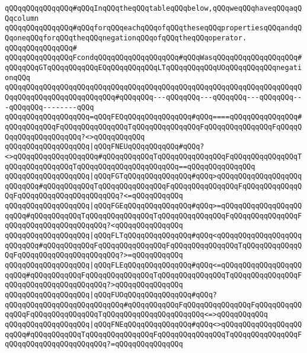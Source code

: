 \verb|qQQqqQQqqQQqqQQq#qQQqInqQQqtheqQQqtableqQQqbelow,qQQqweqQQqhaveqQQqaqQQqcolumn|\newline
\verb|qQQqqQQqqQQqqQQq#qQQqforqQQqeachqQQqofqQQqtheseqQQqpropertiesqQQqandqQQqoneqQQqforqQQqtheqQQqnegationqQQqofqQQqtheqQQqoperator.|\newline
\verb|qQQqqQQqqQQqqQQq#|\newline
\verb|qQQqqQQqqQQqqQQqFcondqQQqqQQqqQQqqQQqqQQq#qQQqWasqQQqqQQqqQQqqQQqqQQq#qQQqqQQqGTqQQqqQQqqQQqEQqQQqqQQqqQQqLTqQQqqQQqqQQqUOqQQqqQQqqQQqnegationqQQq|\newline
\verb|qQQqqQQqqQQqqQQqqQQqqQQqqQQqqQQqqQQqqQQqqQQqqQQqqQQqqQQqqQQqqQQqqQQqqQQqqQQqqQQqqQQqqQQqqQQqqQQq#qQQqqQQq---qQQqqQQq---qQQqqQQq---qQQqqQQq---qQQqqQQq--------qQQq|\newline
\verb|qQQqqQQqqQQqqQQqqQQq=qQQqFEQqQQqqQQqqQQqqQQq#qQQq====qQQqqQQqqQQqqQQq#qQQqqQQqqQQqFqQQqqQQqqQQqqQQqTqQQqqQQqqQQqqQQqFqQQqqQQqqQQqqQQqFqQQqqQQqqQQqqQQqqQQqqQQq?<>qQQqqQQqqQQq|\newline
\verb|qQQqqQQqqQQqqQQqqQQq|\verb#|qQQqFNEUqQQqqQQqqQQq#\verb|#qQQq?<>qQQqqQQqqQQqqQQqqQQq#qQQqqQQqqQQqTqQQqqQQqqQQqqQQqFqQQqqQQqqQQqqQQqTqQQqqQQqqQQqqQQqTqQQqqQQqqQQqqQQqqQQqqQQq==qQQqqQQqqQQqqQQq|\newline
\verb|qQQqqQQqqQQqqQQqqQQq|\verb#|qQQqFGTqQQqqQQqqQQqqQQq#\verb|#qQQq>qQQqqQQqqQQqqQQqqQQqqQQqqQQq#qQQqqQQqqQQqTqQQqqQQqqQQqqQQqFqQQqqQQqqQQqqQQqFqQQqqQQqqQQqqQQqFqQQqqQQqqQQqqQQqqQQqqQQq?<=qQQqqQQqqQQq|\newline
\verb|qQQqqQQqqQQqqQQqqQQq|\verb#|qQQqFGEqQQqqQQqqQQqqQQq#\verb|#qQQq>=qQQqqQQqqQQqqQQqqQQqqQQq#qQQqqQQqqQQqTqQQqqQQqqQQqqQQqTqQQqqQQqqQQqqQQqFqQQqqQQqqQQqqQQqFqQQqqQQqqQQqqQQqqQQqqQQq?<qQQqqQQqqQQqqQQq|\newline
\verb|qQQqqQQqqQQqqQQqqQQq|\verb#|qQQqFLTqQQqqQQqqQQqqQQq#\verb|#qQQq<qQQqqQQqqQQqqQQqqQQqqQQqqQQq#qQQqqQQqqQQqFqQQqqQQqqQQqqQQqFqQQqqQQqqQQqqQQqTqQQqqQQqqQQqqQQqFqQQqqQQqqQQqqQQqqQQqqQQq?>=qQQqqQQqqQQq|\newline
\verb|qQQqqQQqqQQqqQQqqQQq|\verb#|qQQqFLEqQQqqQQqqQQqqQQq#\verb|#qQQq<=qQQqqQQqqQQqqQQqqQQqqQQq#qQQqqQQqqQQqFqQQqqQQqqQQqqQQqTqQQqqQQqqQQqqQQqTqQQqqQQqqQQqqQQqFqQQqqQQqqQQqqQQqqQQqqQQq?>qQQqqQQqqQQqqQQq|\newline
\verb|qQQqqQQqqQQqqQQqqQQq|\verb#|qQQqFUOqQQqqQQqqQQqqQQq#\verb|#qQQq?qQQqqQQqqQQqqQQqqQQqqQQqqQQq#qQQqqQQqqQQqFqQQqqQQqqQQqqQQqFqQQqqQQqqQQqqQQqFqQQqqQQqqQQqqQQqTqQQqqQQqqQQqqQQqqQQqqQQq<=>qQQqqQQqqQQq|\newline
\verb|qQQqqQQqqQQqqQQqqQQq|\verb#|qQQqFNEqQQqqQQqqQQqqQQq#\verb|#qQQq<>qQQqqQQqqQQqqQQqqQQqqQQq#qQQqqQQqqQQqTqQQqqQQqqQQqqQQqFqQQqqQQqqQQqqQQqTqQQqqQQqqQQqqQQqFqQQqqQQqqQQqqQQqqQQqqQQq?=qQQqqQQqqQQqqQQq|\newline

